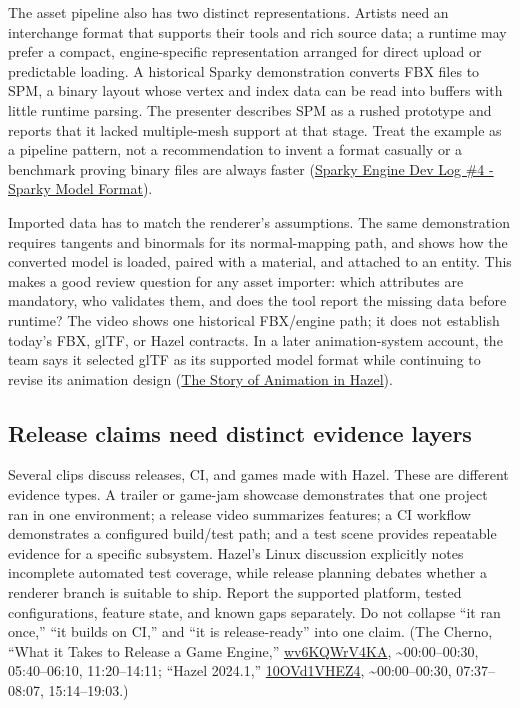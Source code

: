 The asset pipeline also has two distinct representations. Artists need an interchange format that supports their tools and rich source data; a runtime may prefer a compact, engine-specific representation arranged for direct upload or predictable loading. A historical Sparky demonstration converts FBX files to SPM, a binary layout whose vertex and index data can be read into buffers with little runtime parsing. The presenter describes SPM as a rushed prototype and reports that it lacked multiple-mesh support at that stage. Treat the example as a pipeline pattern, not a recommendation to invent a format casually or a benchmark proving binary files are always faster (\href{https://www.youtube.com/watch?v=EUy8G3uMitI&t=3m47s}{Sparky Engine Dev Log \#4 - Sparky Model Format}).

Imported data has to match the renderer's assumptions. The same demonstration requires tangents and binormals for its normal-mapping path, and shows how the converted model is loaded, paired with a material, and attached to an entity. This makes a good review question for any asset importer: which attributes are mandatory, who validates them, and does the tool report the missing data before runtime? The video shows one historical FBX/engine path; it does not establish today's FBX, glTF, or Hazel contracts. In a later animation-system account, the team says it selected glTF as its supported model format while continuing to revise its animation design (\href{https://www.youtube.com/watch?v=HPZo1oFESYQ&t=2m45s}{The Story of Animation in Hazel}).

\subsection{Release claims need distinct evidence layers}\label{06-engine-ii-ch041-release-claims-need-distinct-evidence-layers}

\hypertarget{06-engine-ii-ch041-release-claims-need-distinct-evidence-layers}{}

Several clips discuss releases, CI, and games made with Hazel. These are different evidence types. A trailer or game-jam showcase demonstrates that one project ran in one environment; a release video summarizes features; a CI workflow demonstrates a configured build/test path; and a test scene provides repeatable evidence for a specific subsystem. Hazel's Linux discussion explicitly notes incomplete automated test coverage, while release planning debates whether a renderer branch is suitable to ship. Report the supported platform, tested configurations, feature state, and known gaps separately. Do not collapse ``it ran once,'' ``it builds on CI,'' and ``it is release-ready'' into one claim. (The Cherno, ``What it Takes to Release a Game Engine,'' \href{https://www.youtube.com/watch?v=wv6KQWrV4KA}{wv6KQWrV4KA}, \textasciitilde00:00--00:30, 05:40--06:10, 11:20--14:11; ``Hazel 2024.1,'' \href{https://www.youtube.com/watch?v=10OVd1VHEZ4}{10OVd1VHEZ4}, \textasciitilde00:00--00:30, 07:37--08:07, 15:14--19:03.)

